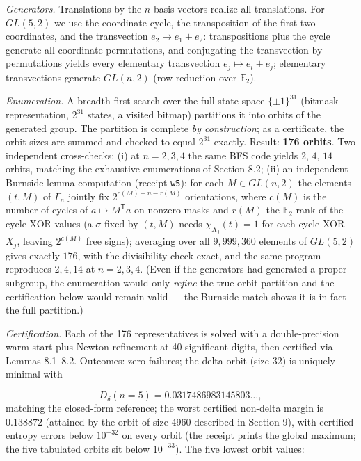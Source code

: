 \documentclass[11pt]{article}
\begin{document}
\emph{Generators.}  Translations by the $n$ basis vectors realize all translations.  For $GL(5,2)$ we use the coordinate cycle, the transposition of the first two coordinates, and the transvection $e_2 \mapsto e_1 + e_2$: transpositions plus the cycle generate all coordinate permutations, and conjugating the transvection by permutations yields every elementary transvection $e_j \mapsto e_i + e_j$; elementary transvections generate $GL(n,2)$ (row reduction over $\mathbb{F}_2$).

\emph{Enumeration.}  A breadth-first search over the full state space $\{\pm1\}^{31}$ (bitmask representation, $2^{31}$ states, a visited bitmap) partitions it into orbits of the generated group.  The partition is complete \emph{by construction}; as a certificate, the orbit sizes are summed and checked to equal $2^{31}$ exactly.  Result: \textbf{176 orbits}.  Two independent cross-checks: (i) at $n = 2, 3, 4$ the same BFS code yields $2$, $4$, $14$ orbits, matching the exhaustive enumerations of Section 8.2; (ii) an independent Burnside-lemma computation (receipt \texttt{w5}): for each $M \in GL(n,2)$ the elements $(t, M)$ of $\Gamma_n$ jointly fix $2^{c(M) + n - r(M)}$ orientations, where $c(M)$ is the number of cycles of $a \mapsto M^{\mathsf T}a$ on nonzero masks and $r(M)$ the $\mathbb{F}_2$-rank of the cycle-XOR values (a $\sigma$ fixed by $(t,M)$ needs $\chi_{X_j}(t) = 1$ for each cycle-XOR $X_j$, leaving $2^{c(M)}$ free signs); averaging over all $9{,}999{,}360$ elements of $GL(5,2)$ gives exactly $176$, with the divisibility check exact, and the same program reproduces $2, 4, 14$ at $n = 2, 3, 4$.  (Even if the generators had generated a proper subgroup, the enumeration would only \emph{refine} the true orbit partition and the certification below would remain valid — the Burnside match shows it is in fact the full partition.)

\emph{Certification.}  Each of the 176 representatives is solved with a double-precision warm start plus Newton refinement at 40 significant digits, then certified via Lemmas 8.1–8.2.  Outcomes: zero failures; the delta orbit (size 32) is uniquely minimal with

\[
D_\delta(n{=}5) = 0.0317486983145803\ldots,
\]
matching the closed-form reference; the worst certified non-delta margin is $0.138872$ (attained by the orbit of size 4960 described in Section 9), with certified entropy errors below $10^{-32}$ on every orbit (the receipt prints the global maximum; the five tabulated orbits sit below $10^{-33}$).  The five lowest orbit values:
\end{document}
